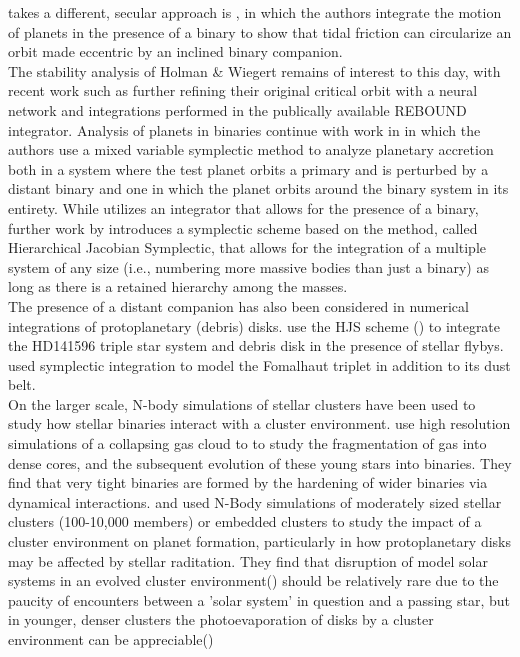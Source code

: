 \documentclass{aastex631}
\begin{document}
takes a different, secular approach is \cite{fab07}, in which the authors integrate the motion of planets in the presence of a binary to show that tidal friction can circularize an 
orbit made eccentric by an inclined binary companion.\\
The stability analysis of Holman \& Wiegert remains of interest to this day, with recent work such as \cite{lam18} further refining
their original critical orbit with a neural network and integrations performed in the publically available REBOUND integrator.
 Analysis of planets in binaries continue with work 
in \cite{cha02} in which the authors use a mixed variable symplectic method to analyze planetary accretion both in a system where the test planet orbits a primary and 
is perturbed by a distant binary and one in which the planet orbits around the binary system in its entirety. While \cite{cha02} utilizes an integrator that allows for the presence 
of a binary, further work by \cite{beu03} introduces a symplectic scheme based on the \cite{wis91} method, called Hierarchical Jacobian Symplectic, that allows for the 
integration of a multiple system of any size (i.e., numbering more massive bodies than just a binary) as long as there is a retained
hierarchy among the masses.  \\
The presence of a distant companion has also been considered in numerical integrations of protoplanetary (debris) disks. \cite{rec09} use the HJS scheme (\cite{beu03}) 
to integrate the HD141596 triple star system and debris disk in the presence of stellar flybys. 
\cite{beu14} used symplectic integration to model the Fomalhaut triplet in addition to its dust belt.  \\

\indent On the larger scale, N-body simulations of stellar clusters have been used to study how stellar binaries interact with a cluster environment. \cite{bat03} 
use high resolution simulations of a collapsing gas cloud to to study the fragmentation of gas into dense cores, 
and the subsequent evolution of these young stars into binaries. They find that very
 tight binaries are formed by the hardening of wider binaries via dynamical interactions. \cite{ada06} and \cite{pro09} used N-Body simulations of moderately sized stellar clusters
  (100-10,000 members) or embedded clusters to study the impact of a cluster environment on planet formation, particularly in how protoplanetary disks may be affected by stellar raditation.
  They find that disruption of model solar systems in an evolved cluster environment(\cite{ada06}) should be relatively rare due to the paucity of encounters between a 'solar system' 
  in question and a passing star, but in younger, denser clusters the photoevaporation of disks by a cluster environment can be appreciable(\cite{pro09})
  
\end{document}
